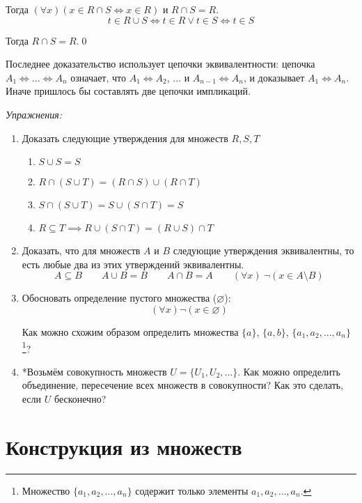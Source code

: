 Тогда $(\forall x)(x\in R\cap S\iff x\in R)$ и $R\cap S=R$.
\[
	t\in R\cup S\iff t\in R\lor t\in S\iff t\in S
\]

Тогда $R\cap S=R$.\qed

Последнее доказательство использует цепочки эквивалентности:
цепочка $A_1\iff...\iff A_{n}$ означает, что $A_1\iff A_2$, ... и
$A_{n-1}\iff A_{n}$, и доказывает $A_1\iff A_{n}$. Иначе пришлось
бы составлять две цепочки импликаций.

\pagebreak

\newcommand\eset{\varnothing}
{\it Упражнения:}
\begin{enumerate}
	\item{}Доказать следующие утверждения для множеств $R,S,T$
	\begin{fullwidth}
		\begin{multicols}{2}
			\begin{enumerate}
				\item{}$S\cup S=S$
				\item{}$R\cap (S\cup T)=(R\cap S)\cup (R\cap T)$
				\item{}$S\cap (S\cup T)=S\cup (S\cap T)=S$
				\item{}$R\subseteq T\implies R\cup (S\cap T)=(R\cup S)\cap T$
			\end{enumerate}
		\end{multicols}
	\end{fullwidth}

	\item{}Доказать, что для множеств $A$ и $B$ следующие утверждения эквивалентны,
	то есть любые два из этих утверждений эквивалентны.
	\[
		A\subseteq B\qquad A\cup B=B\qquad A\cap B=A
		\qquad (\forall x)~\lnot(x\in A\setminus B)
	\]

	\item{}Обосновать определение пустого множества ($\eset$):
	\[
		(\forall x)\lnot(x\in \eset)
	\]

	Как можно схожим образом определить множества $\{a\}$, $\{a,b\}$,
	$\{a_1,a_2,...,a_{n}\}$\footnote{
	Множество $\{a_1,a_2,...,a_{n}\}$ содержит только элементы $a_1,a_2,...,a_{n}$.
	}?
	\item{}*Возьмём совокупность множеств $U=\{U_{1},U_{2},...\}$.
	Как можно определить объединение, пересечение всех множеств в совокупности?
	Как это сделать, если $U$ бесконечно?
\end{enumerate}

\section{Конструкция из множеств}

